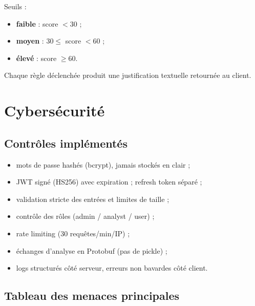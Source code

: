 \documentclass[11pt,a4paper]{article}
\begin{document}
Seuils :
\begin{itemize}
  \item \textbf{faible} : score $< 30$ ;
  \item \textbf{moyen} : $30 \leq$ score $< 60$ ;
  \item \textbf{élevé} : score $\geq 60$.
\end{itemize}

Chaque règle déclenchée produit une justification textuelle retournée au client.

\section{Cybersécurité}

\subsection{Contrôles implémentés}

\begin{itemize}
  \item mots de passe hashés (bcrypt), jamais stockés en clair ;
  \item JWT signé (HS256) avec expiration ; refresh token séparé ;
  \item validation stricte des entrées et limites de taille ;
  \item contrôle des rôles (admin / analyst / user) ;
  \item rate limiting (30 requêtes/min/IP) ;
  \item échanges d'analyse en Protobuf (pas de pickle) ;
  \item logs structurés côté serveur, erreurs non bavardes côté client.
\end{itemize}

\subsection{Tableau des menaces principales}
\end{document}
